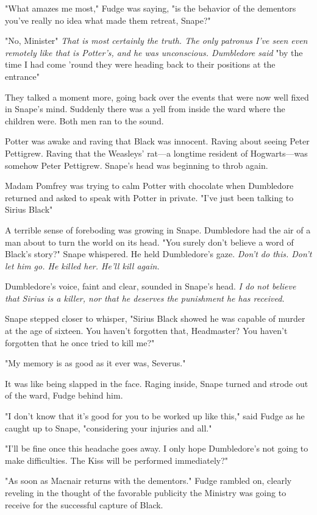 "What amazes me most," Fudge was saying, "is the behavior of the dementors{\el} you've really no idea what made them retreat, Snape?"

"No, Minister{\el}" \emph{That is most certainly the truth. The only patronus I've seen even remotely like that is Potter's, and he was unconscious. Dumbledore said{\el}} "by the time I had come 'round they were heading back to their positions at the entrance{\el}"

They talked a moment more, going back over the events that were now well fixed in Snape's mind. Suddenly there was a yell from inside the ward where the children were. Both men ran to the sound.

Potter was awake and raving that Black was innocent. Raving about seeing Peter Pettigrew. Raving that the Weasleys' rat—a longtime resident of Hogwarts—was somehow Peter Pettigrew. Snape's head was beginning to throb again.

Madam Pomfrey was trying to calm Potter with chocolate when Dumbledore returned and asked to speak with Potter in private. "I've just been talking to Sirius Black{\el}"

A terrible sense of foreboding was growing in Snape. Dumbledore had the air of a man about to turn the world on its head. "You surely don't believe a word of Black's story?" Snape whispered. He held Dumbledore's gaze. \emph{Don't do this. Don't let him go. He killed her. He'll kill again.}

Dumbledore's voice, faint and clear, sounded in Snape's head. \emph{I do not believe that Sirius is a killer, nor that he deserves the punishment he has received.}

Snape stepped closer to whisper, "Sirius Black showed he was capable of murder at the age of sixteen. You haven't forgotten that, Headmaster? You haven't forgotten that he once tried to kill me?"

"My memory is as good as it ever was, Severus."

It was like being slapped in the face. Raging inside, Snape turned and strode out of the ward, Fudge behind him.

"I don't know that it's good for you to be worked up like this," said Fudge as he caught up to Snape, "considering your injuries and all."

"I'll be fine once this headache goes away. I only hope Dumbledore's not going to make difficulties. The Kiss will be performed immediately?"

"As soon as Macnair returns with the dementors." Fudge rambled on, clearly reveling in the thought of the favorable publicity the Ministry was going to receive for the successful capture of Black.

